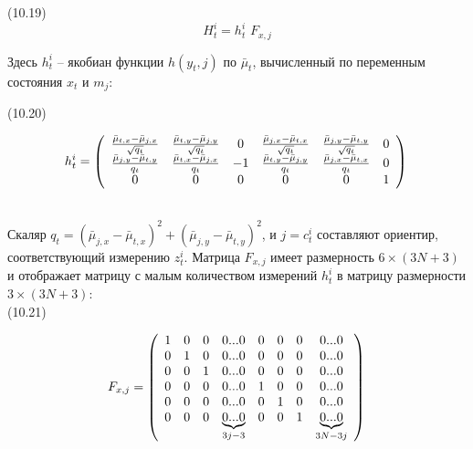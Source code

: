 \documentclass[10pt,a4paper]{article}
\begin{document}
(10.19)
$$H_t^i=h_t^i\,\,F_{x,j}$$

Здесь $h_t^i$ – якобиан функции $h(y_t,j)$ по $\bar{\mu}_t$, вычисленный по переменным состояния $x_t$ и $m_j$:

(10.20)
\begin{minipage}{0.2\textwidth}
\begin{equation*}
h_t^i=\left(\begin{array}{cccccc} 
\frac{\bar{\mu}_{t,x}-\bar{\mu}_{j,x}}{\sqrt{q_t}}&\frac{\bar{\mu}_{t,y}-\bar{\mu}_{j,y}}{\sqrt{q_t}}&0&\frac{\bar{\mu}_{j,x}-\bar{\mu}_{t,x}}{\sqrt{q_t}}&\frac{\bar{\mu}_{j,y}-\bar{\mu}_{t,y}}{\sqrt{q_t}}&0\\	\frac{\bar{\mu}_{j,y}-\bar{\mu}_{t,y}}{q_t}&\frac{\bar{\mu}_{t,x}-\bar{\mu}_{j,x}}{q_t}&-1&\frac{\bar{\mu}_{t,y}-\bar{\mu}_{j,y}}{q_t}&\frac{\bar{\mu}_{j,x}-\bar{\mu}_{t,x}}{q_t}&0\\
0&0&0&0&0&1\\
\end{array} \right)\\
\end{equation*}
\end{minipage}\\

Скаляр $q_t=(\bar{\mu}_{j,x}-\bar{\mu}_{t,x})^2+(\bar{\mu}_{j,y}-\bar{\mu}_{t,y})^2$, и $j=c_t^i$ составляют ориентир, соответствующий измерению $z_t^i$. Матрица $F_{x,j}$ имеет размерность $6\times(3N+3)$ и отображает матрицу с малым количеством измерений  $h_t^i$  в матрицу размерности $3\times(3N+3)$:\\

(10.21)
\begin{minipage}{0.2\textwidth}
\begin{equation*}
F_{x,j}=\left(\begin{array}{cccccccc} 
1&0&0&0...0&0&0&0&0...0\\
0&1&0&0...0&0&0&0&0...0\\
0&0&1&0...0&0&0&0&0...0\\
0&0&0&0...0&1&0&0&0...0\\
0&0&0&0...0&0&1&0&0...0\\
0&0&0&\underbrace{0...0}_{3j-3}&0&0&1&\underbrace{0...0}_{3N-3j}
\end{array} \right)\\
\end{equation*}
\end{minipage}
\end{document}

